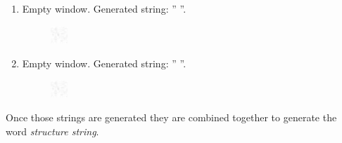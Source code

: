 \begin{enumerate}[label=(\alph*)]
\begin{figure}[!htpb]
\end{figure} 
\item Empty window. Generated string: ''\emph{ }''.
\begin{figure}[!htpb]
\centering
\includegraphics[width=0.06\textwidth]{images/missouri/11.png}
\end{figure} 
\item Empty window. Generated string: ''\emph{ }''.
\begin{figure}[!htpb]
\centering
\includegraphics[width=0.06\textwidth]{images/missouri/12.png}
\end{figure} 
\end{enumerate}

Once those strings are generated they are combined together to generate the word \textit{structure string}. 

